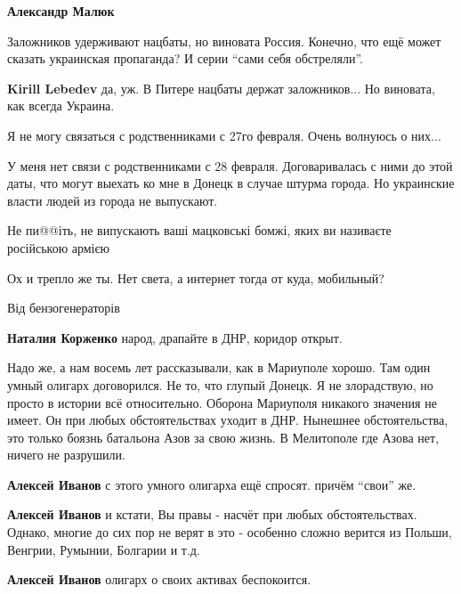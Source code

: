 \begin{itemize}
\begin{itemize}
\textbf{Александр Малюк} 

Заложников удерживают нацбаты, но виновата Россия. Конечно, что ещё может
сказать украинская пропаганда? И серии \enquote{сами себя обстреляли}.

\textbf{Kirill Lebedev} да, уж. В Питере нацбаты держат заложников... Но виновата, как всегда Украина.

\end{itemize} %

Я не могу связаться с родственниками с 27го февраля. Очень волнуюсь о них...


У меня нет связи с родственниками с 28 февраля. Договаривалась с ними до этой
даты, что могут выехать ко мне в Донецк в случае штурма города. Но украинские
власти людей из города не выпускают.

Не пи@@іть, не випускають ваші мацковські бомжі, яких ви називаєте російською армією

Ох и трепло же ты. Нет света, а интернет тогда от куда, мобильный?

\begin{itemize} %
Від бензогенераторів

\textbf{Наталия Корженко} народ, драпайте в ДНР, коридор открыт.
\end{itemize} %


Надо же, а нам восемь лет рассказывали, как в Мариуполе хорошо. Там один умный
олигарх договорился. Не то, что глупый Донецк. Я не злорадствую, но просто в
истории всё относительно. Оборона Мариуполя никакого значения не имеет. Он при
любых обстоятельствах уходит в ДНР. Нынешнее обстоятельства, это только боязнь
батальона Азов за свою жизнь. В Мелитополе где Азова нет, ничего не разрушили.

\begin{itemize} %
\textbf{Алексей Иванов} с этого умного олигарха ещё спросят. причём \enquote{свои} же.

\textbf{Алексей Иванов} и кстати, Вы правы - насчёт при любых обстоятельствах. Однако, многие до сих пор не верят в это - особенно сложно верится из Польши, Венгрии, Румынии, Болгарии и т.д.

\textbf{Алексей Иванов} олигарх о своих активах беспокоится.


\end{itemize}
\end{itemize}
